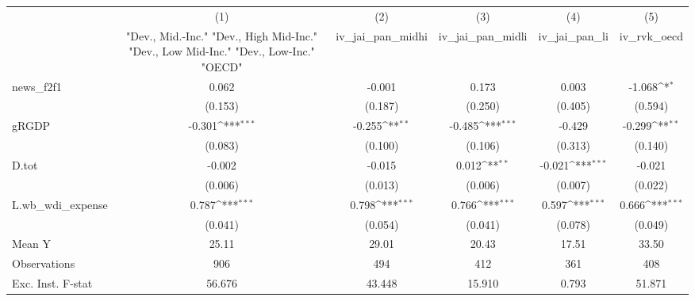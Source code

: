 {
\def\sym#1{\ifmmode^{#1}\else\(^{#1}\)\fi}
\begin{tabular}{l*{5}{c}}
\toprule
            &\multicolumn{1}{c}{(1)}&\multicolumn{1}{c}{(2)}&\multicolumn{1}{c}{(3)}&\multicolumn{1}{c}{(4)}&\multicolumn{1}{c}{(5)}\\
            &\multicolumn{1}{c}{ "Dev., Mid.-Inc." "Dev., High Mid-Inc." "Dev., Low Mid-Inc." "Dev., Low-Inc." "OECD" }&\multicolumn{1}{c}{iv\_jai\_pan\_midhi}&\multicolumn{1}{c}{iv\_jai\_pan\_midli}&\multicolumn{1}{c}{iv\_jai\_pan\_li}&\multicolumn{1}{c}{iv\_rvk\_oecd}\\
\midrule
news\_f2f1   &       0.062         &      -0.001         &       0.173         &       0.003         &      -1.068\sym{*}  \\
            &     (0.153)         &     (0.187)         &     (0.250)         &     (0.405)         &     (0.594)         \\
\addlinespace
gRGDP       &      -0.301\sym{***}&      -0.255\sym{**} &      -0.485\sym{***}&      -0.429         &      -0.299\sym{**} \\
            &     (0.083)         &     (0.100)         &     (0.106)         &     (0.313)         &     (0.140)         \\
\addlinespace
D.tot       &      -0.002         &      -0.015         &       0.012\sym{**} &      -0.021\sym{***}&      -0.021         \\
            &     (0.006)         &     (0.013)         &     (0.006)         &     (0.007)         &     (0.022)         \\
\addlinespace
L.wb\_wdi\_expense&       0.787\sym{***}&       0.798\sym{***}&       0.766\sym{***}&       0.597\sym{***}&       0.666\sym{***}\\
            &     (0.041)         &     (0.054)         &     (0.041)         &     (0.078)         &     (0.049)         \\
\midrule
Mean Y      &       25.11         &       29.01         &       20.43         &       17.51         &       33.50         \\
Observations&         906         &         494         &         412         &         361         &         408         \\
Exc. Inst. F-stat&      56.676         &      43.448         &      15.910         &       0.793         &      51.871         \\
\bottomrule
\end{tabular}
}
